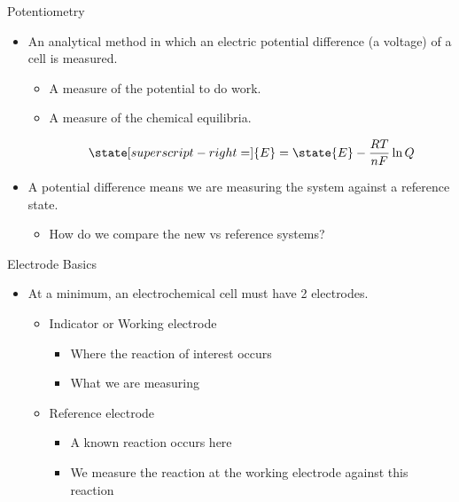 \documentclass[notes=only]{beamer}
\begin{document}
\begin{frame}{Potentiometry}
	\begin{itemize}[<+->]
		\item An analytical method in which an electric potential
			difference (a voltage) of a cell is measured.
			\begin{itemize}
				\item A measure of the potential to do work.
				\item A measure of the \alert{chemical
					equilibria}.

					\begin{equation*}
						\state[superscript-right=]{E} =
						\state{E} - \frac{RT}{nF} \ln Q
					\end{equation*}
			\end{itemize}
		\item A potential \alert{difference} means we are measuring the
			system against a \alert{reference} state.
			\begin{itemize}
				\item How do we compare the new vs reference
					systems?
			\end{itemize}
	\end{itemize}
\end{frame}

\begin{frame}{Electrode Basics}
	\begin{itemize}
		\item At a \alert{minimum}, an electrochemical cell must have
			\alert{2} electrodes.
			\begin{itemize}
				\item Indicator or Working electrode
					\begin{itemize}
						\item Where the reaction of
							interest occurs
						\item What we are measuring
					\end{itemize}
				\item Reference electrode
					\begin{itemize}
						\item A known reaction occurs
							here
						\item We measure the reaction at
							the working electrode
							\alert{against} this
							reaction
					\end{itemize}
			\end{itemize}
	\end{itemize}
\end{frame}
\end{document}
